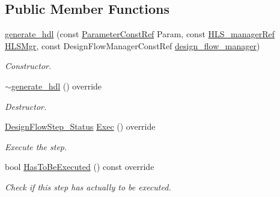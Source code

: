 \subsection*{Public Member Functions}
\begin{DoxyCompactItemize}
\item 
\hyperlink{classgenerate__hdl_aa156846721581846f1b6c593c212656b}{generate\+\_\+hdl} (const \hyperlink{Parameter_8hpp_a37841774a6fcb479b597fdf8955eb4ea}{Parameter\+Const\+Ref} Param, const \hyperlink{hls__manager_8hpp_acd3842b8589fe52c08fc0b2fcc813bfe}{H\+L\+S\+\_\+manager\+Ref} \hyperlink{classHLS__step_ade85003a99d34134418451ddc46a18e9}{H\+L\+S\+Mgr}, const Design\+Flow\+Manager\+Const\+Ref \hyperlink{classDesignFlowStep_ab770677ddf087613add30024e16a5554}{design\+\_\+flow\+\_\+manager})
\begin{DoxyCompactList}\small\item\em Constructor. \end{DoxyCompactList}\item 
\hyperlink{classgenerate__hdl_a8131966dd34b98977735ed8161b6c305}{$\sim$generate\+\_\+hdl} () override
\begin{DoxyCompactList}\small\item\em Destructor. \end{DoxyCompactList}\item 
\hyperlink{design__flow__step_8hpp_afb1f0d73069c26076b8d31dbc8ebecdf}{Design\+Flow\+Step\+\_\+\+Status} \hyperlink{classgenerate__hdl_a3d6fb722c230dc38b6c90646f59c79c2}{Exec} () override
\begin{DoxyCompactList}\small\item\em Execute the step. \end{DoxyCompactList}\item 
bool \hyperlink{classgenerate__hdl_a6b5a0a9f67703606268a1eccafc389aa}{Has\+To\+Be\+Executed} () const override
\begin{DoxyCompactList}\small\item\em Check if this step has actually to be executed. \end{DoxyCompactList}\end{DoxyCompactItemize}
